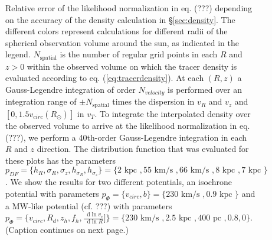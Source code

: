 \documentclass[12pt,preprint]{aastex}
\newcommand*\diff{\mathop{}\!\mathrm{d}}
\begin{document}
\begin{figure}
\caption{Relative error of the likelihood normalization in eq. (???) depending on the accuracy of the density calculation in \S\ref{sec:density}. The different colors represent calculations for different radii of the spherical observation volume around the sun, as indicated in the legend. $N_\text{spatial}$ is the number of regular grid points in each $R$ and $z > 0$ within the observed volume on which the tracer density is evaluated according to eq. (\ref{eq:tracerdensity}). At each $(R,z)$ a Gauss-Legendre integration of order $N_{velocity}$ is performed over an integration range of $\pm N_\text{spatial}$ times the dispersion in $v_R$ and $v_z$ and $[0,1.5v_{circ}(R_\odot)]$ in $v_T$. To integrate the interpolated density over the observed volume to arrive at the likelihood normalization in eq. (???), we perform a 40th-order Gauss-Legendre integration in each $R$ and $z$ direction. The distribution function that was evaluated for these plots has the parameters $p_{DF} = \{ h_R, \sigma_R, \sigma_z,h_{\sigma_R},h_{\sigma_z}\} =\{2 \text{ kpc }, 55 \text{ km/s }, 66 \text{ km/s }, 8 \text{ kpc }, 7 \text{ kpc }\} $. We show the results for two different potentials, an isochrone potential with parameters $p_\Phi = \{v_{circ},b \}=\{230 \text{ km/s },0.9\text{ kpc } \}$ and a MW-like potential (cf. ???) with parameters $p_\Phi = \{v_{circ},R_d,z_h,f_h,\frac{\diff\ln v_c}{\diff\ln R}] \}=\{230 \text{ km/s },2.5\text{ kpc },400 \text{ pc }, 0.8,0\}$. (Caption continues on next page.)} 
\label{fig:norm_accuracy}
\end{figure}
\end{document}
